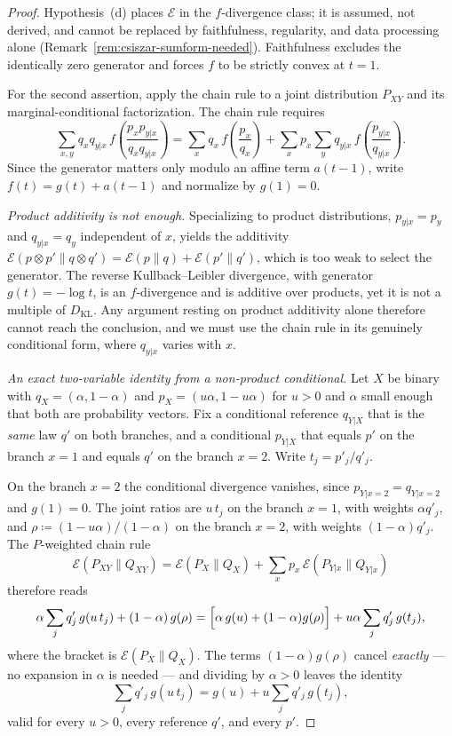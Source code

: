 \documentclass[12pt]{article}
\theoremstyle{definition}
\begin{document}
\begin{proof}
Hypothesis~(d) places $\mathcal E$ in the $f$-divergence class; it is assumed,
not derived, and cannot be replaced by faithfulness, regularity, and data
processing alone (Remark~\ref{rem:csiszar-sumform-needed}).  Faithfulness
excludes the identically zero generator and forces $f$ to be strictly convex
at $t=1$.

For the second assertion, apply the chain rule to a joint distribution
$P_{XY}$ and its marginal-conditional factorization.  The chain rule requires
\[
\sum_{x,y} q_x q_{y|x}\,
f\!\left(\frac{p_x p_{y|x}}{q_x q_{y|x}}\right)
=
\sum_x q_x\,f\!\left(\frac{p_x}{q_x}\right)
+
\sum_x p_x
\sum_y q_{y|x}\,
f\!\left(\frac{p_{y|x}}{q_{y|x}}\right).
\]
Since the generator matters only modulo an affine term $a(t-1)$, write
$f(t)=g(t)+a(t-1)$ and normalize by $g(1)=0$.

\emph{Product additivity is not enough.}  Specializing to product
distributions, $p_{y|x}=p_y$ and $q_{y|x}=q_y$ independent of $x$, yields the
additivity
$\mathcal E(p\otimes p'\|q\otimes q')=\mathcal E(p\|q)+\mathcal E(p'\|q')$,
which is too weak to select the generator.  The reverse
Kullback--Leibler divergence, with generator $g(t)=-\log t$, is an
$f$-divergence and is additive over products, yet it is not a multiple of
$D_{\mathrm{KL}}$.  Any argument resting on product additivity alone therefore
cannot reach the conclusion, and we must use the chain rule in its genuinely
conditional form, where $q_{y|x}$ varies with $x$.

\emph{An exact two-variable identity from a non-product conditional.}  Let $X$
be binary with $q_X=(\alpha,1-\alpha)$ and $p_X=(u\alpha,1-u\alpha)$ for
$u>0$ and $\alpha$ small enough that both are probability vectors.  Fix a
conditional reference $q_{Y|X}$ that is the \emph{same} law $q'$ on both
branches, and a conditional $p_{Y|X}$ that equals $p'$ on the branch $x=1$ and
equals $q'$ on the branch $x=2$.  Write $t_j=p'_j/q'_j$.

On the branch $x=2$ the conditional divergence vanishes, since
$p_{Y|x=2}=q_{Y|x=2}$ and $g(1)=0$.  The joint ratios are $u\,t_j$ on the
branch $x=1$, with weights $\alpha q'_j$, and $\rho\coloneqq(1-u\alpha)/(1-\alpha)$
on the branch $x=2$, with weights $(1-\alpha)q'_j$.  The $P$-weighted chain
rule
\[
\mathcal E(P_{XY}\|Q_{XY})
=
\mathcal E(P_X\|Q_X)
+
\sum_xp_x\,\mathcal E(P_{Y|x}\|Q_{Y|x})
\]
therefore reads
\[
\alpha\sum_jq'_j\,g(u\,t_j)
+
(1-\alpha)\,g(\rho)
=
\Bigl[\alpha\,g(u)+(1-\alpha)g(\rho)\Bigr]
+
u\alpha\sum_jq'_j\,g(t_j),
\]
where the bracket is $\mathcal E(P_X\|Q_X)$.  The terms $(1-\alpha)g(\rho)$
cancel \emph{exactly} --- no expansion in $\alpha$ is needed --- and dividing
by $\alpha>0$ leaves the identity
\[
\sum_jq'_j\,g(u\,t_j)
=
g(u)+u\sum_jq'_j\,g(t_j),
\tag{$\dagger$}
\]
valid for every $u>0$, every reference $q'$, and every $p'$.


\end{proof}
\end{document}
